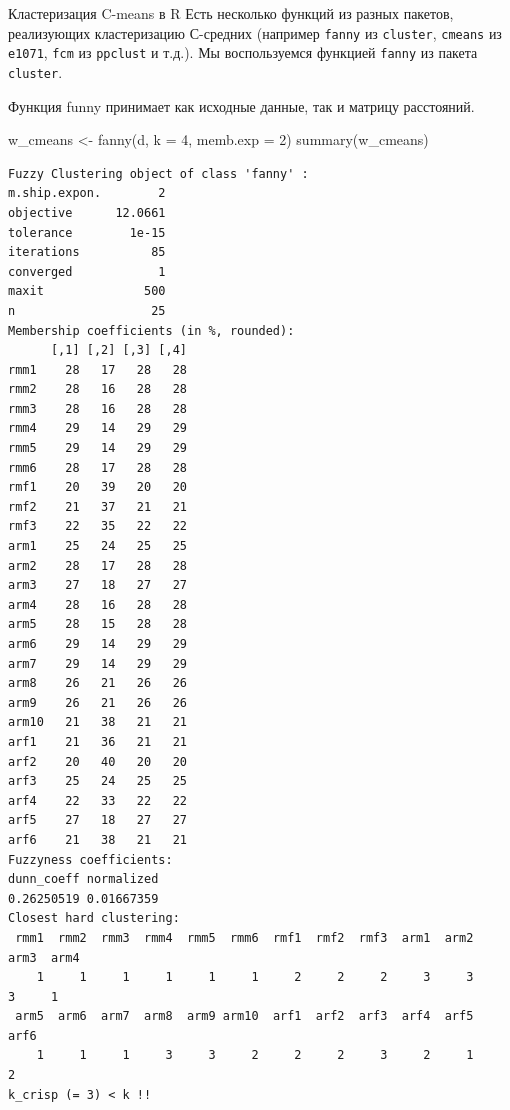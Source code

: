 \documentclass[
  ignorenonframetext,
  russian,
]{beamer}
\newenvironment{Shaded}{\begin{snugshade}}{\end{snugshade}}
\newcommand{\AttributeTok}[1]{\textcolor[rgb]{0.40,0.45,0.13}{#1}}
\newcommand{\DecValTok}[1]{\textcolor[rgb]{0.68,0.00,0.00}{#1}}
\newcommand{\FunctionTok}[1]{\textcolor[rgb]{0.28,0.35,0.67}{#1}}
\newcommand{\NormalTok}[1]{\textcolor[rgb]{0.00,0.23,0.31}{#1}}
\newcommand{\OtherTok}[1]{\textcolor[rgb]{0.00,0.23,0.31}{#1}}
\begin{document}
\begin{frame}[fragile]{Кластеризация C-means в R}
\protect{}\label{ux43aux43bux430ux441ux442ux435ux440ux438ux437ux430ux446ux438ux44f-c-means-ux432-r}
Есть несколько функций из разных пакетов, реализующих кластеризацию
С-средних (например \texttt{fanny} из \texttt{cluster}, \texttt{cmeans}
из \texttt{e1071}, \texttt{fcm} из \texttt{ppclust} и т.д.). Мы
воспользуемся функцией \texttt{fanny} из пакета \texttt{cluster}.

Функция funny принимает как исходные данные, так и матрицу расстояний.

\tiny

\begin{Shaded}
\begin{Highlighting}[]
\NormalTok{w\_cmeans }\OtherTok{\textless{}{-}} \FunctionTok{fanny}\NormalTok{(d, }\AttributeTok{k =} \DecValTok{4}\NormalTok{, }\AttributeTok{memb.exp =} \DecValTok{2}\NormalTok{)}
\FunctionTok{summary}\NormalTok{(w\_cmeans)}
\end{Highlighting}
\end{Shaded}

\begin{verbatim}
Fuzzy Clustering object of class 'fanny' :                      
m.ship.expon.        2
objective      12.0661
tolerance        1e-15
iterations          85
converged            1
maxit              500
n                   25
Membership coefficients (in %, rounded):
      [,1] [,2] [,3] [,4]
rmm1    28   17   28   28
rmm2    28   16   28   28
rmm3    28   16   28   28
rmm4    29   14   29   29
rmm5    29   14   29   29
rmm6    28   17   28   28
rmf1    20   39   20   20
rmf2    21   37   21   21
rmf3    22   35   22   22
arm1    25   24   25   25
arm2    28   17   28   28
arm3    27   18   27   27
arm4    28   16   28   28
arm5    28   15   28   28
arm6    29   14   29   29
arm7    29   14   29   29
arm8    26   21   26   26
arm9    26   21   26   26
arm10   21   38   21   21
arf1    21   36   21   21
arf2    20   40   20   20
arf3    25   24   25   25
arf4    22   33   22   22
arf5    27   18   27   27
arf6    21   38   21   21
Fuzzyness coefficients:
dunn_coeff normalized 
0.26250519 0.01667359 
Closest hard clustering:
 rmm1  rmm2  rmm3  rmm4  rmm5  rmm6  rmf1  rmf2  rmf3  arm1  arm2  arm3  arm4 
    1     1     1     1     1     1     2     2     2     3     3     3     1 
 arm5  arm6  arm7  arm8  arm9 arm10  arf1  arf2  arf3  arf4  arf5  arf6 
    1     1     1     3     3     2     2     2     3     2     1     2 
k_crisp (= 3) < k !!


\end{verbatim}
\end{frame}
\end{document}
